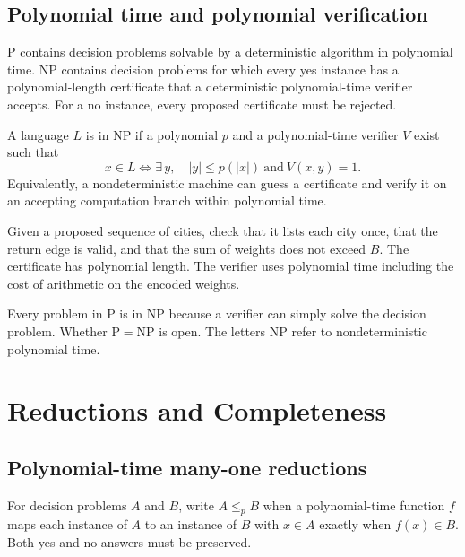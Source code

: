 \documentclass[12pt,a4paper]{article}
\begin{document}
\subsection{Polynomial time and polynomial verification}
\begin{tcolorbox}[defbox, title={The classes P and NP}]
$\mathrm{P}$ contains decision problems solvable by a deterministic algorithm in polynomial time. $\mathrm{NP}$ contains decision problems for which every yes instance has a polynomial-length certificate that a deterministic polynomial-time verifier accepts. For a no instance, every proposed certificate must be rejected.
\end{tcolorbox}

\begin{tcolorbox}[formulabox, title={Formal verifier definition}]
A language $L$ is in $\mathrm{NP}$ if a polynomial $p$ and a polynomial-time verifier $V$ exist such that
\[
x\in L \iff \exists\, y,\quad |y|\le p(|x|)\ \text{and}\ V(x,y)=1.
\]
Equivalently, a nondeterministic machine can guess a certificate and verify it on an accepting computation branch within polynomial time.
\end{tcolorbox}

\begin{tcolorbox}[examplebox, title={Verifying the decision version of TSP}]
Given a proposed sequence of cities, check that it lists each city once, that the return edge is valid, and that the sum of weights does not exceed $B$. The certificate has polynomial length. The verifier uses polynomial time including the cost of arithmetic on the encoded weights.
\end{tcolorbox}

Every problem in $\mathrm{P}$ is in $\mathrm{NP}$ because a verifier can simply solve the decision problem. Whether $\mathrm{P}=\mathrm{NP}$ is open. The letters NP refer to nondeterministic polynomial time.

\section{Reductions and Completeness}
\subsection{Polynomial-time many-one reductions}
\begin{tcolorbox}[defbox, title={Polynomial-time reduction}]
For decision problems $A$ and $B$, write $A\le_p B$ when a polynomial-time function $f$ maps each instance of $A$ to an instance of $B$ with $x\in A$ exactly when $f(x)\in B$. Both yes and no answers must be preserved.
\end{tcolorbox}
\end{document}
